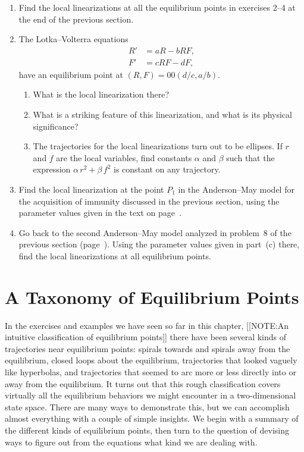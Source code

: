 \begin{enumerate}
\item Find the local linearizations at all the equilibrium points in
exercises 2--4 at the end of the previous section.


\item The Lotka--Volterra equations
\begin{align*}
R' &= aR-bRF, \\
F' &= cRF-dF,
\end{align*}
have an equilibrium point at $(R, F) = 00(d/c, a/b)$.

  \begin{enumerate}
  \item What is the local linearization there?

  \item What is a striking feature of this linearization, and what is its
physical significance?

  \item The trajectories for the local linearizations turn out to be
ellipses.  If $r$ and $f$ are the local variables, find constants
$\alpha$ and $\beta$ such that the expression $\alpha\,
r^2+\beta\,f^2$ is constant on any trajectory.


\end{enumerate}
\item Find the local linearization at the point $P_1$ in the
Anderson--May model for the acquisition of immunity discussed in the
previous section, using the parameter values given in the text on
page~\pageref{paramvals}.


\item Go back to the second Anderson--May model analyzed in problem~8
of the previous section (page~\pageref{AMay2}).  Using the parameter
values given in part~(c) there, find the local linearizations at all
equilibrium points.


\end{enumerate}
\section{A Taxonomy of Equilibrium Points} 
\label{sec:a-taxonomy-of-equilibrium-points}
\label{taxonomy}

In the exercises and examples we have seen so far in this chapter, 
[[NOTE:An intuitive classification of equilibrium points]] 
there have been several kinds of trajectories near equilibrium points:
spirals towards and spirals away from the equilibrium, closed loops
about the equilibrium, trajectories that looked vaguely like
hyperbolas, and trajectories that seemed to arc more or less directly
into or away from the equilibrium.  It turns out that this rough
classification covers virtually all the equilibrium behaviors we might
encounter in a two-dimensional state space.  There are many ways to
demonstrate this, but we can accomplish almost everything with a
couple of simple insights.  We begin with a summary of the different
kinds of equilibrium points, then turn to the question of devising
ways to figure out from the equations what kind we are dealing with.

